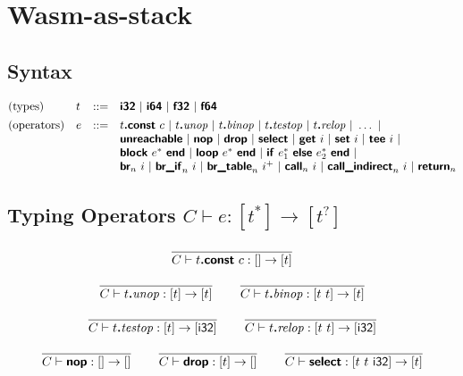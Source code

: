 \documentclass[a4paper]{scrartcl}
\newcommand\x[1]{\ensuremath{\mathit{#1}}\xspace}
\newcommand\K[1]{\ensuremath{\textsf{#1}}}
\newcommand\KK[1]{\ensuremath{\K{\textbf{#1}}}}
\begin{document}

\section{Wasm-as-stack}


\subsection*{Syntax}

$$
\begin{array}{@{}llcl@{}}
\text{(types)} & t &::=&
  \KK{i32} ~|~
  \KK{i64} ~|~
  \KK{f32} ~|~
  \KK{f64} \\
[1ex]
\text{(operators)} & e &::=&
  t\KK{.const}~c ~|~
  t\KK{.}\x{unop} ~|~
  t\KK{.}\x{binop} ~|~
  t\KK{.}\x{testop} ~|~
  t\KK{.}\x{relop} ~|~
  \dots ~|~ \\&&&
  \KK{unreachable} ~|~
  \KK{nop} ~|~
  \KK{drop} ~|~
  \KK{select} ~|~
  \KK{get}~i ~|~
  \KK{set}~i ~|~
  \KK{tee}~i ~|~ \\&&&
  \KK{block}~e^\ast~\KK{end} ~|~
  \KK{loop}~e^\ast~\KK{end} ~|~
  \KK{if}~e_1^\ast~\KK{else}~e_2^\ast~\KK{end} ~|~ \\&&&
  \KK{br}_n~i ~|~
  \KK{br\_if}_n~i ~|~
  \KK{br\_table}_n~i^+ ~|~
  \KK{call}_n~i ~|~
  \KK{call\_indirect}_n~i ~|~
  \KK{return}_n \\
\end{array}
$$


\newcommand\orbot{}
\newcommand\poly[1]{[#1]}
\newcommand\botrule[1]{}


\subsection*{Typing Operators \hfill $\boxed{C \vdash e : [t^\ast] \to [t^?]\orbot}$}

$$
\frac{
}{
  C \vdash t\KK{.const}~c : [] \to [t]
}
$$

$$
\frac{
}{
  C \vdash t\KK{.}\x{unop} : [t] \to [t]
}
\qquad
\frac{
}{
  C \vdash t\KK{.}\x{binop} : [t~t] \to [t]
}
$$

$$
\frac{
}{
  C \vdash t\KK{.}\x{testop} : [t] \to [\K{i32}]
}
\qquad
\frac{
}{
  C \vdash t\KK{.}\x{relop} : [t~t] \to [\K{i32}]
}
$$

$$
\frac{
}{
  C \vdash \KK{nop} : [] \to []
}
\qquad
\frac{
}{
  C \vdash \KK{drop} : [t] \to []
}
\qquad
\frac{
}{
  C \vdash \KK{select} : [t~t~\K{i32}] \to [t]
}
$$
\end{document}
